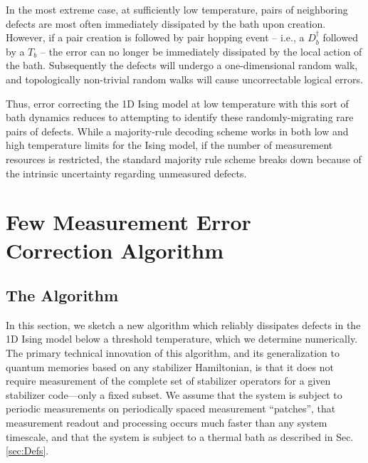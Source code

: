 \documentclass[twocolumn,superscriptaddress,aps,prb,floatfix]{revtex4-1}
\begin{document}
 In the most extreme case, at sufficiently low temperature, pairs of neighboring defects are most often immediately dissipated by the bath upon creation.  However, if a pair creation is followed by pair hopping event -- i.e., a $D^\dagger_{b}$ followed by a $T_{b}$ -- the error can no longer be immediately dissipated by the local action of the bath.  Subsequently the defects will undergo a one-dimensional random walk, and topologically non-trivial random walks will cause uncorrectable logical errors.
 
 Thus, error correcting the 1D Ising model at low temperature with this sort of bath dynamics reduces to attempting to identify these randomly-migrating rare pairs of defects.  While a majority-rule decoding scheme works in both low and high temperature limits for the Ising model, if the number of measurement resources is restricted, the standard majority rule scheme breaks down because of the intrinsic uncertainty regarding unmeasured defects.
 
 
\section{Few Measurement Error Correction Algorithm}
\label{sec:ecc_alg}

\subsection{The Algorithm}

In this section, we sketch a new algorithm which reliably dissipates defects in the 1D Ising model below a threshold temperature, which we determine numerically.  The primary technical innovation of this algorithm, and its generalization to quantum memories based on any stabilizer Hamiltonian, is that it does not require measurement of the complete set of stabilizer operators for a given stabilizer code---only a fixed subset.  We assume that the system is subject to periodic measurements on periodically spaced measurement ``patches'', that measurement readout and processing occurs much faster than any system timescale, and that the system is subject to a thermal bath as described in Sec. \ref{sec:Defs}.
\end{document}
